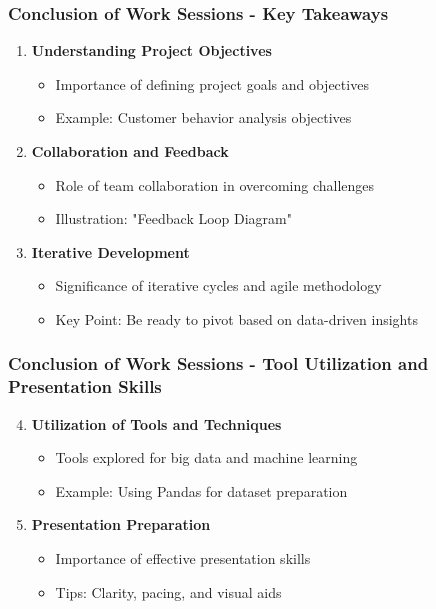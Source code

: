 \documentclass[aspectratio=169]{beamer}
\begin{document}
\begin{frame}[fragile]
    \frametitle{Conclusion of Work Sessions - Key Takeaways}
    
    \begin{enumerate}
        \item \textbf{Understanding Project Objectives}
        \begin{itemize}
            \item Importance of defining project goals and objectives
            \item Example: Customer behavior analysis objectives
        \end{itemize}

        \item \textbf{Collaboration and Feedback}
        \begin{itemize}
            \item Role of team collaboration in overcoming challenges
            \item Illustration: "Feedback Loop Diagram"
        \end{itemize}
        
        \item \textbf{Iterative Development}
        \begin{itemize}
            \item Significance of iterative cycles and agile methodology
            \item Key Point: Be ready to pivot based on data-driven insights
        \end{itemize}
    \end{enumerate}
\end{frame}

\begin{frame}[fragile]
    \frametitle{Conclusion of Work Sessions - Tool Utilization and Presentation Skills}

    \begin{enumerate}
        \setcounter{enumi}{3}
        \item \textbf{Utilization of Tools and Techniques}
        \begin{itemize}
            \item Tools explored for big data and machine learning
            \item Example: Using Pandas for dataset preparation
        \end{itemize}
        
        \item \textbf{Presentation Preparation}
        \begin{itemize}
            \item Importance of effective presentation skills
            \item Tips: Clarity, pacing, and visual aids
        \end{itemize}
    \end{enumerate}
\end{frame}
\end{document}
